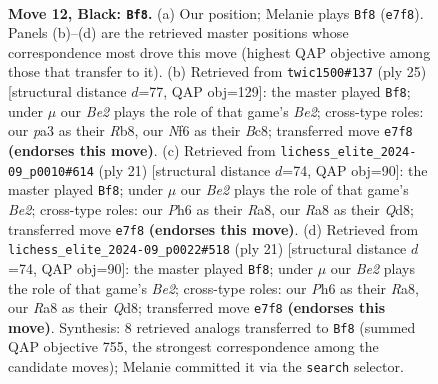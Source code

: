 \documentclass[11pt]{article}
\begin{document}
\clearpage

\begin{figure}[p]\centering
\begin{subfigure}{0.46\textwidth}\centering
\resizebox{\linewidth}{!}{%
\newchessgame
\chessboard[
  setfen={r2qr1k1/1bp1bpp1/p1np1n1p/1p2p3/4P3/PBNP1N1P/1PPB1PP1/R2QR1K1 b - - 2 12},
  showmover=false,
  pgfstyle=straightmove, color=movearrow, markmove={e7-f8}
]}
\caption{}
\end{subfigure}\hfill
\begin{subfigure}{0.46\textwidth}\centering
\resizebox{\linewidth}{!}{%
\newchessgame
\chessboard[
  setfen={1rbqr1k1/2p1bpp1/p1np1n1p/P3p3/1p2P3/1B1PBN1P/1PPN1PP1/R2QR1K1 b - - 0 13},
  showmover=false,
  pgfstyle=straightmove, color=movearrow, markmove={e7-f8}
]}
\caption{}
\end{subfigure}
\\[4pt]
\begin{subfigure}{0.46\textwidth}\centering
\resizebox{\linewidth}{!}{%
\newchessgame
\chessboard[
  setfen={r2qr1k1/1bp1bppp/p1np1n2/1p2p3/3PP3/1BP2N1P/PP1N1PP1/R1BQR1K1 b - - 2 11},
  showmover=false,
  pgfstyle=straightmove, color=movearrow, markmove={e7-f8}
]}
\caption{}
\end{subfigure}\hfill
\begin{subfigure}{0.46\textwidth}\centering
\resizebox{\linewidth}{!}{%
\newchessgame
\chessboard[
  setfen={r2qr1k1/1bp1bppp/p1np1n2/1p2p3/3PP3/1BP2N1P/PP1N1PP1/R1BQR1K1 b - - 2 11},
  showmover=false,
  pgfstyle=straightmove, color=movearrow, markmove={e7-f8}
]}
\caption{}
\end{subfigure}
\caption{\textbf{Move 12, Black: \texttt{Bf8}.} (a) Our position; Melanie plays \texttt{Bf8} (\texttt{e7f8}). Panels (b)--(d) are the retrieved master positions whose correspondence most drove this move (highest QAP objective among those that transfer to it). (b) Retrieved from \texttt{twic1500\#137} (ply 25) [structural distance $d$=77, QAP obj=129]: the master played \texttt{Bf8}; under $\mu$ our \emph{Be2} plays the role of that game's \emph{Be2}; cross-type roles: our \emph{p}a3 as their \emph{R}b8, our \emph{N}f6 as their \emph{B}c8; transferred move \texttt{e7f8} \textbf{(endorses this move)}. (c) Retrieved from \texttt{lichess\_elite\_2024-09\_p0010\#614} (ply 21) [structural distance $d$=74, QAP obj=90]: the master played \texttt{Bf8}; under $\mu$ our \emph{Be2} plays the role of that game's \emph{Be2}; cross-type roles: our \emph{P}h6 as their \emph{R}a8, our \emph{R}a8 as their \emph{Q}d8; transferred move \texttt{e7f8} \textbf{(endorses this move)}. (d) Retrieved from \texttt{lichess\_elite\_2024-09\_p0022\#518} (ply 21) [structural distance $d$=74, QAP obj=90]: the master played \texttt{Bf8}; under $\mu$ our \emph{Be2} plays the role of that game's \emph{Be2}; cross-type roles: our \emph{P}h6 as their \emph{R}a8, our \emph{R}a8 as their \emph{Q}d8; transferred move \texttt{e7f8} \textbf{(endorses this move)}. Synthesis: 8 retrieved analogs transferred to \texttt{Bf8} (summed QAP objective 755, the strongest correspondence among the candidate moves); Melanie committed it via the \texttt{search} selector.}
\label{fig:thought-m23}
\end{figure}
\end{document}

